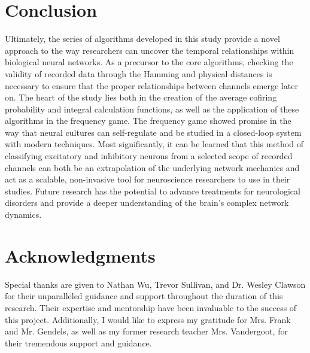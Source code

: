 \documentclass{article} %
\begin{document}
\section{Conclusion}
Ultimately, the series of algorithms developed in this study provide a novel approach to the way researchers can uncover the temporal relationships within biological neural networks. As a precursor to the core algorithms, checking the validity of recorded data through the Hamming and physical distances is necessary to ensure that the proper relationships between channels emerge later on. The heart of the study lies both in the creation of the average cofiring probability and integral calculation functions, as well as the application of these algorithms in the frequency game. The frequency game showed promise in the way that neural cultures can self-regulate and be studied in a closed-loop system with modern techniques. Most significantly, it can be learned that this method of classifying excitatory and inhibitory neurons from a selected scope of recorded channels can both be an extrapolation of the underlying network mechanics and act as a scalable, non-invasive tool for neuroscience researchers to use in their studies. Future research has the potential to advance treatments for neurological disorders and provide a deeper understanding of the brain's complex network dynamics.

\section{Acknowledgments}
Special thanks are given to Nathan Wu, Trevor Sullivan, and Dr. Wesley Clawson for their unparalleled guidance and support throughout the duration of this research. Their expertise and mentorship have been invaluable to the success of this project. Additionally, I would like to express my gratitude for Mrs. Frank and Mr. Gendels, as well as my former research teacher Mrs. Vandergoot, for their tremendous support and guidance.


\newpage

\printbibliography
\end{document}
